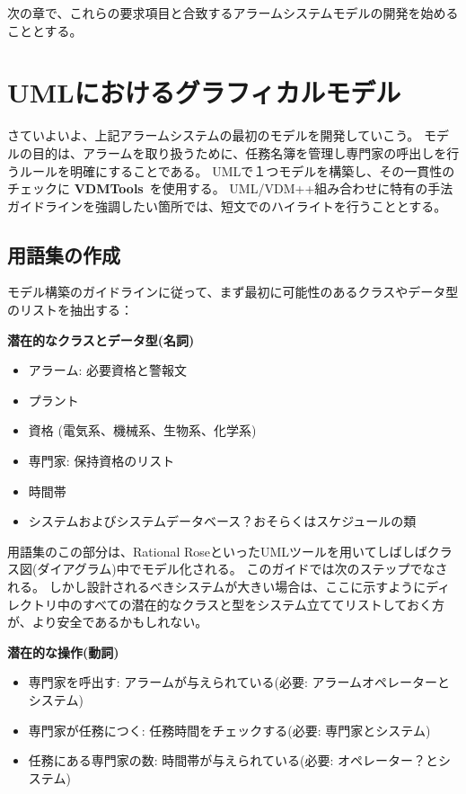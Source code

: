 \documentclass[\pformat,12pt,twoside]{jarticle}
\newcommand{\vdmtools}{\textbf{VDMTools}}
\begin{document}
次の章で、これらの要求項目と合致するアラームシステムモデルの開発を始めることとする。

\section{UMLにおけるグラフィカルモデル}

さていよいよ、上記アラームシステムの最初のモデルを開発していこう。
モデルの目的は、アラームを取り扱うために、任務名簿を管理し専門家の呼出しを行うルールを明確にすることである。
UMLで１つモデルを構築し、その一貫性のチェックに \vdmtools\ を使用する。
UML/VDM++組み合わせに特有の手法ガイドラインを強調したい箇所では、短文でのハイライトを行うこととする。

\subsection{用語集の作成}

モデル構築のガイドラインに従って、まず最初に可能性のあるクラスやデータ型のリストを抽出する：

\textbf{潜在的なクラスとデータ型(名詞)}
\begin{itemize}
\item アラーム: 必要資格と警報文
\item プラント
\item 資格 (電気系、機械系、生物系、化学系)
\item 専門家: 保持資格のリスト
\item 時間帯
\item システムおよびシステムデータベース？おそらくはスケジュールの類
\end{itemize}

用語集のこの部分は、Rational RoseといったUMLツールを用いてしばしばクラス図(ダイアグラム)中でモデル化される。
このガイドでは次のステップでなされる。
しかし設計されるべきシステムが大きい場合は、ここに示すようにディレクトリ中のすべての潜在的なクラスと型をシステム立ててリストしておく方が、より安全であるかもしれない。

\textbf{潜在的な操作(動詞)}
\begin{itemize}
\item 専門家を呼出す: アラームが与えられている(必要: アラームオペレーターとシステム)
\item 専門家が任務につく: 任務時間をチェックする(必要: 専門家とシステム)
\item 任務にある専門家の数: 時間帯が与えられている(必要: オペレーター？とシステム)
\end{itemize}
\end{document}
